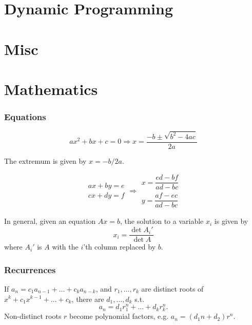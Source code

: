\section{Dynamic Programming}
\section{Misc}


\section{Mathematics}

\subsubsection{Equations}
\[ax^2+bx+c=0 \Rightarrow x = \frac{-b\pm\sqrt{b^2-4ac}}{2a}\]

The extremum is given by $x = -b/2a$.

\[\begin{aligned}ax+by=e\\cx+dy=f\end{aligned}
\Rightarrow
\begin{aligned}x=\dfrac{ed-bf}{ad-bc}\\y=\dfrac{af-ec}{ad-bc}\end{aligned}\]

In general, given an equation $Ax = b$, the solution to a variable $x_i$ is given by
\[x_i = \frac{\det A_i'}{\det A} \]
where $A_i'$ is $A$ with the $i$'th column replaced by $b$.

\subsubsection{Recurrences}
If $a_n = c_1 a_{n-1} + \dots + c_k a_{n-k}$, and $r_1, \dots, r_k$ are distinct roots of $x^k + c_1 x^{k-1} + \dots + c_k$, there are $d_1, \dots, d_k$ s.t.
\[a_n = d_1r_1^n + \dots + d_kr_k^n. \]
Non-distinct roots $r$ become polynomial factors, e.g. $a_n = (d_1n + d_2)r^n$.

